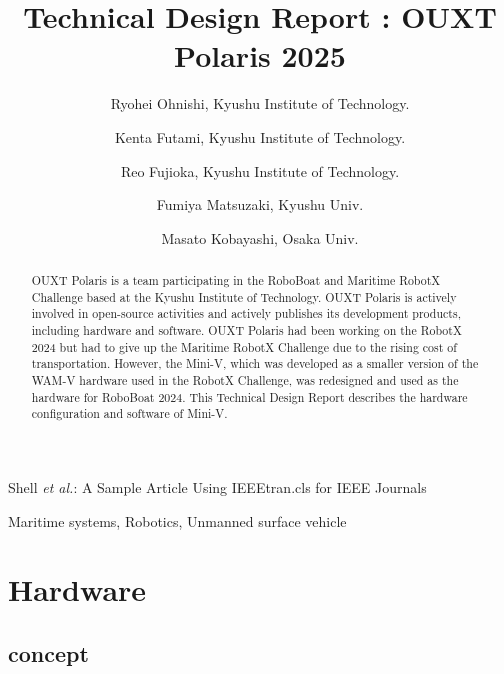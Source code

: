 \documentclass[lettersize,journal]{IEEEtran}
\begin{document}
\title{Technical Design Report : OUXT Polaris 2025}
\author{
    Ryohei Ohnishi, Kyushu Institute of Technology. \\ \and
    Kenta Futami, Kyushu Institute of Technology. \\ \and
    Reo Fujioka, Kyushu Institute of Technology. \\ \and
    Fumiya Matsuzaki, Kyushu Univ. \\ \and
    Masato Kobayashi, Osaka Univ.
}

%
{Shell \MakeLowercase{\textit{et al.}}: A Sample Article Using IEEEtran.cls for IEEE Journals}


\maketitle

\begin{abstract}
  OUXT Polaris is a team participating in the RoboBoat and Maritime RobotX Challenge based at the Kyushu Institute of Technology.
  OUXT Polaris is actively involved in open-source activities and actively publishes its development products, including hardware and software.
  OUXT Polaris had been working on the RobotX 2024 but had to give up the Maritime RobotX Challenge due to the rising cost of transportation. However, the Mini-V, which was developed as a smaller version of the WAM-V hardware used in the RobotX Challenge, was redesigned and used as the hardware for RoboBoat 2024.
  This Technical Design Report describes the hardware configuration and software of Mini-V.
\end{abstract}

\begin{IEEEkeywords}
Maritime systems, Robotics, Unmanned surface vehicle
\end{IEEEkeywords}

\section{Hardware}

\subsection{concept}
\end{document}
